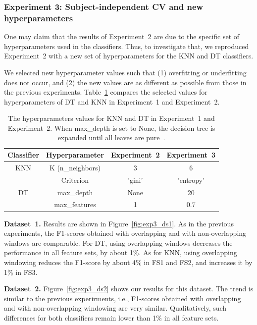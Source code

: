 \subsubsection{Experiment 3: Subject-independent CV and new hyperparameters } \label{sec:ex3}
One may claim that the results of Experiment~2 
are due to the specific set of hyperparameters used in the classifiers. Thus, to investigate that, we reproduced Experiment~2 with a new set of hyperparameters for the KNN and DT classifiers.

We selected new hyperparameter values such that (1) overfitting or underfitting does not occur, and (2) the new values are as different as possible from those in the previous experiments. Table~\ref{tab:hparams} compares the selected values for hyperparameters of DT and KNN in Experiment~1 and Experiment~2. 

\begin{table}[]
    \centering
\begin{tabular}{|>{}c|>{}c|>{}c|>{}c|}
\hline 
\multirow{1}{*}{Classifier} & Hyperparameter & Experiment~2 & Experiment~3\tabularnewline
\hline 
KNN & K (n\_neighbors) & 3 & 6\tabularnewline
\hline 
\multirow{3}{*}{DT} & Criterion & 'gini' & 'entropy'\tabularnewline
\cline{2-4} \cline{3-4} \cline{4-4} 
 & max\_depth & None & 20\tabularnewline
\cline{2-4} \cline{3-4} \cline{4-4} 
 & max\_features & 1 & 0.7\tabularnewline
\hline 
\end{tabular}
    \caption{The hyperparameters values for KNN and DT in Experiment~1 and Experiment~2. When max\_depth is set to None, the decision tree is expanded until all leaves are pure~\cite{pedregosa2011scikit}.}
    \label{tab:hparams}
\end{table}

\noindent\textbf{Dataset~1.} Results are shown in Figure~\ref{fig:exp3_ds1}. As in the previous experiments, the F1-scores obtained with overlapping and with non-overlapping windows are comparable. For DT, using overlapping windows decreases the performance in all feature sets, by about 1\%. As for KNN, using overlapping windowing reduces the F1-score by about 4\% in FS1 and FS2, and increases it by 1\% in FS3.   

\noindent\textbf{Dataset~2.} Figure~\ref{fig:exp3_ds2} shows our results for this dataset. The trend is similar to the previous experirments, i.e., F1-scores obtained with overlapping and with non-overlapping windowing are very similar. Qualitatively, such differences for both classifiers remain lower than 1\% in all feature sets.  

